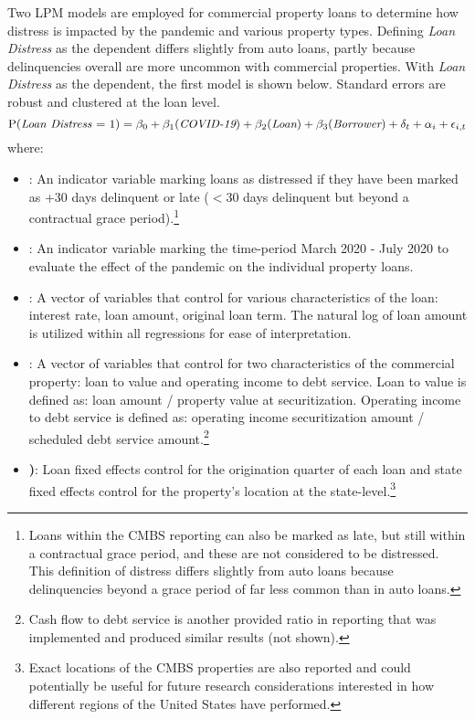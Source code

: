 \documentclass[10.5pt]{article}
\begin{document}
Two LPM models are employed for commercial property loans to determine how distress is impacted by the pandemic and various property types. Defining \textit{Loan Distress} as the dependent differs slightly from auto loans, partly because delinquencies overall are more uncommon with commercial properties. With \textit{Loan Distress} as the dependent, the first model is shown below. Standard errors are robust and clustered at the loan level.   
\begin{equation}
    \text{P(\textit{Loan Distress} = 1)} = \beta_0 +
    \beta_1(\textit{COVID-19}) +
    \beta_2(\textit{Loan}) + \beta_3(\textit{Borrower}) +
    \delta_t + \alpha_i + \epsilon_{i,t}
\end{equation}
where: 
\begin{itemize}[label=$-$, leftmargin=*]
    \item \textbf{}: An indicator variable marking loans as distressed if they have been marked as +30 days delinquent or late ($<$30 days delinquent but beyond a contractual grace period).\footnote{Loans within the CMBS reporting can also be marked as late, but still within a contractual grace period, and these are not considered to be distressed. This definition of distress differs slightly from auto loans because delinquencies beyond a grace period of far less common than in auto loans.}
    \item \textbf{}: An indicator variable marking the time-period March 2020 - July 2020 to evaluate the effect of the pandemic on the individual property loans.
    \item \textbf{}: A vector of variables that control for various characteristics of the loan: interest rate, loan amount, original loan term. The natural log of loan amount is utilized within all regressions for ease of interpretation.  
    \item \textbf{}: A vector of variables that control for two characteristics of the commercial property: loan to value and operating income to debt service. Loan to value is defined as: loan amount / property value at securitization. Operating income to debt service is defined as: operating income securitization amount / scheduled debt service amount.\footnote{Cash flow to debt service is another provided ratio in reporting that was implemented and produced similar results (not shown).} 
    \item \textbf{)}: Loan fixed effects control for the origination quarter of each loan and state fixed effects control for the property's location at the state-level.\footnote{Exact locations of the CMBS properties are also reported and could potentially be useful for future research considerations interested in how different regions of the United States have performed.}
\end{itemize}
\end{document}
